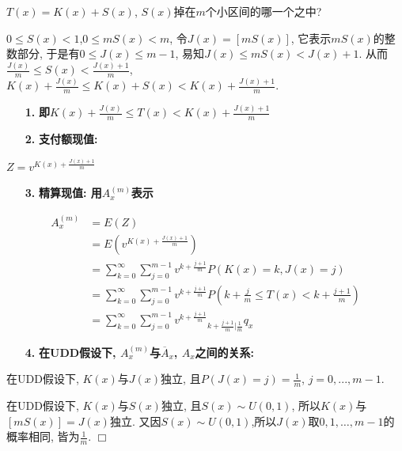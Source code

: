 \documentclass[a4paper,10pt]{ctexbook}
\newcommand{\hei}{\CJKfamily{hei}}      %
\def\qed{\hfill$\Box$\medskip}
\begin{document}
$T(x)=K(x)+S(x)$, $S(x)$掉在$m$个小区间的哪一个之中?

$0 \leq S(x)<1$,$0\leq mS(x)<m$, 令$J(x)=[mS(x)]$, 它表示$mS(x)$的整数部分, 于是有$0\leq J(x)\leq m-1$, 易知$J(x)\leq mS(x)<J(x)+1$. 从而$\frac{J(x)}{m}\leq S(x)<\frac{J(x)+1}{m}$, $K(x)+\frac{J(x)}{m}\leq K(x)+S(x)< K(x)+\frac{J(x)+1}{m}$.

\begin{itemize}
    \item[{\bf\hei 1.}]{\bf\hei 即$K(x)+\frac{J(x)}{m}\leq T(x)< K(x)+\frac{J(x)+1}{m}$}
\end{itemize}

\begin{itemize}
    \item[{\bf\hei 2.}]{\bf\hei 支付额现值: }
\end{itemize}

$Z=v^{K(x)+\frac{J(x)+1}{m}}$

\begin{itemize}
    \item[{\bf\hei 3.}]{\bf\hei 精算现值: 用$A_{x}^{(m)}$表示}
\end{itemize}
\begin{align*}
    A_{x}^{(m)} & =E(Z)                                                                                            \\
                & =E(v^{K(x)+\frac{J(x)+1}{m}})                                                                    \\
                & =\sum_{k=0}^{\infty}\sum_{j=0}^{m-1}v^{k+\frac{j+1}{m}}P(K(x)=k,J(x)=j)                          \\
                & =\sum_{k=0}^{\infty}\sum_{j=0}^{m-1}v^{k+\frac{j+1}{m}}P(k+\frac{j}{m}\leq T(x)<k+\frac{j+1}{m}) \\
                & =\sum_{k=0}^{\infty}\sum_{j=0}^{m-1}v^{k+\frac{j+1}{m}}{}_{k+\frac{j+1}{m}|\frac{1}{m}}q_{x}
\end{align*}
\begin{itemize}
    \item[{\bf\hei 4.}]{\bf\hei 在UDD假设下, $A_{x}^{(m)}$与$\overline A_{x}$, $A_{x}$之间的关系:}
\end{itemize}

\begin{proposition}
    在UDD假设下, $K(x)$与$J(x)$独立, 且$P(J(x)=j)=\frac{1}{m}$, $j=0, ..., m-1.$
\end{proposition}

\proof
在UDD假设下, $K(x)$与$S(x)$独立, 且$S(x)\sim U(0,1)$, 所以$K(x)$与$[mS(x)]=J(x)$独立. 又因$S(x)\sim U(0,1)$,所以$J(x)$取$0, 1, \dots, m-1$的概率相同, 皆为$\frac{1}{m}$.
\qed
\end{document}

